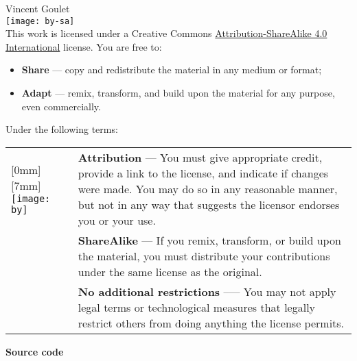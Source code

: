 
\begin{frame}[t,plain,fragile=singleslide]
  \tiny
  \vspace*{10mm}

  \begin{adjustwidth}{15mm}{15mm}
    {\textcopyright} {\year} Vincent Goulet \\[4mm]

    \texttt{[image: by-sa]} \\%

    This work is licensed under a Creative Commons
    \href{http://creativecommons.org/licenses/by-sa/4.0/deed.en}{%
      Attribution-ShareAlike 4.0 International}
    license. You are free to:
    \begin{itemize}
    \item \textbf{Share} --- copy and redistribute the material in any
      medium or format;
    \item \textbf{Adapt} --- remix, transform, and build upon the
      material for any purpose, even commercially.
    \end{itemize}
    Under the following terms: \vspace*{2mm}

    \begin{tabularx}{\linewidth}{@{}lX@{}}
      \raisebox{-5.5mm}[0mm][7mm]{%
        \texttt{[image: by]}} &
      \textbf{Attribution} --- You must give appropriate credit,
      provide a link to the license, and indicate if changes were
      made. You may do so in any reasonable manner, but not in any way
      that suggests the licensor endorses you or your use. \\
      \raisebox{-5.5mm}{\texttt{[image: sa]}}
      & \textbf{ShareAlike} --- If you remix, transform, or build upon
      the material, you must distribute your contributions under the
      same license as the original. \\
      & \textbf{No additional restrictions} --— You may not apply
      legal terms or technological measures that legally restrict
      others from doing anything the license permits.
    \end{tabularx}
    \vspace{2mm}

    \textbf{Source code} \\
    \vspace{2mm}

  \end{adjustwidth}
\end{frame}

